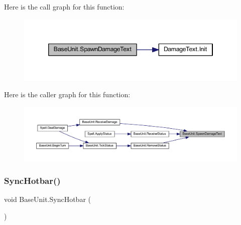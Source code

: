Here is the call graph for this function\+:\nopagebreak
\begin{figure}[H]
\begin{center}
\leavevmode
\includegraphics[width=346pt]{class_base_unit_aacee7b4acfdd28621f3a1b66bf8d646a_cgraph}
\end{center}
\end{figure}
Here is the caller graph for this function\+:\nopagebreak
\begin{figure}[H]
\begin{center}
\leavevmode
\includegraphics[width=350pt]{class_base_unit_aacee7b4acfdd28621f3a1b66bf8d646a_icgraph}
\end{center}
\end{figure}
\mbox{\label{class_base_unit_a15ea3ea70ab13cf8aa582b848cd0531b}} 
\subsubsection{\texorpdfstring{SyncHotbar()}{SyncHotbar()}}
{\footnotesize\ttfamily void Base\+Unit.\+Sync\+Hotbar (\begin{DoxyParamCaption}{ }\end{DoxyParamCaption})}

